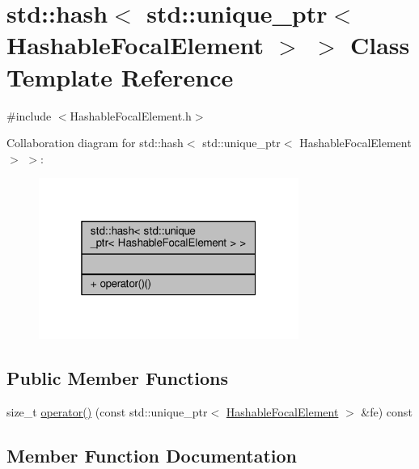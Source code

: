 \hypertarget{classstd_1_1hash_3_01std_1_1unique__ptr_3_01HashableFocalElement_01_4_01_4}{}\section{std\+:\+:hash$<$ std\+:\+:unique\+\_\+ptr$<$ Hashable\+Focal\+Element $>$ $>$ Class Template Reference}
\label{classstd_1_1hash_3_01std_1_1unique__ptr_3_01HashableFocalElement_01_4_01_4}


{\ttfamily \#include $<$Hashable\+Focal\+Element.\+h$>$}



Collaboration diagram for std\+:\+:hash$<$ std\+:\+:unique\+\_\+ptr$<$ Hashable\+Focal\+Element $>$ $>$\+:\nopagebreak
\begin{figure}[H]
\begin{center}
\leavevmode
\includegraphics[width=241pt]{classstd_1_1hash_3_01std_1_1unique__ptr_3_01HashableFocalElement_01_4_01_4__coll__graph}
\end{center}
\end{figure}
\subsection*{Public Member Functions}
\begin{DoxyCompactItemize}
\item 
size\+\_\+t \hyperlink{classstd_1_1hash_3_01std_1_1unique__ptr_3_01HashableFocalElement_01_4_01_4_a7625821524070a3c3be03dc6701d30c4}{operator()} (const std\+::unique\+\_\+ptr$<$ \hyperlink{classHashableFocalElement}{Hashable\+Focal\+Element} $>$ \&fe) const 
\end{DoxyCompactItemize}


\subsection{Member Function Documentation}
\hypertarget{classstd_1_1hash_3_01std_1_1unique__ptr_3_01HashableFocalElement_01_4_01_4_a7625821524070a3c3be03dc6701d30c4}{}
